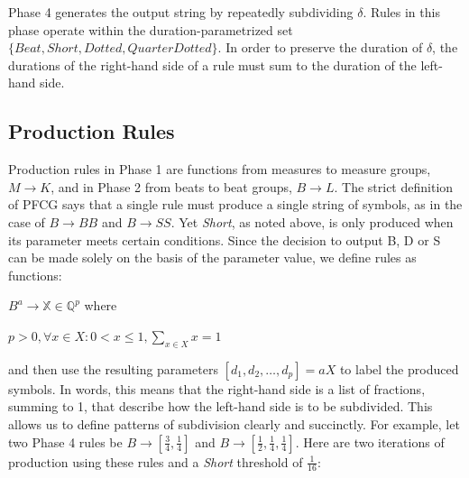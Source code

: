 \documentclass{article}
\begin{document}
Phase 4 generates the output string by repeatedly subdividing $\delta$. Rules in this phase operate within the duration-parametrized set $\{Beat,\allowbreak Short,\allowbreak Dotted,\allowbreak QuarterDotted \}$. In order to preserve the duration of $\delta$, the durations of the right-hand side of a rule must sum to the duration of the left-hand side.









\subsection{Production Rules}

Production rules in Phase 1 are functions from measures to measure groups, $M \rightarrow K$, and in Phase 2 from beats to beat groups, $B \rightarrow L$. The strict definition of PFCG says that a single rule must produce a single string of symbols, as in the case of $B \rightarrow BB$ and $B \rightarrow SS$.  Yet \emph{Short}, as noted above, is only produced when its parameter meets certain conditions. Since the decision to output B, D or S can be made solely on the basis of the parameter value, we define rules as functions:

$B^a \rightarrow \mathbb{X} \in \mathbb{Q}^{p}$ where 

$p > 0 , \forall x \in X: 0 < x \leq 1, \sum_{x \in X} x = 1$

and then use the resulting parameters $[d_1,d_2,\ldots,d_p]=aX$ to label the produced symbols. In words, this means that the right-hand side is a list of fractions, summing to 1, that describe how the left-hand side is to be subdivided. This allows us to define patterns of subdivision clearly and succinctly. For example, let two Phase 4 rules be $B \rightarrow [\frac{3}{4}, \frac{1}{4}]$ and $B \rightarrow [\frac{1}{2}, \frac{1}{4}, \frac{1}{4}]$. Here are two iterations of production using these rules and a \emph{Short} threshold of $\frac{1}{16}$:
\end{document}
